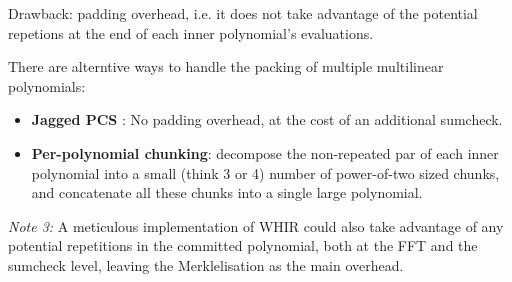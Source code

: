 \documentclass{article}
\theoremstyle{definition}
\begin{document}
Drawback: padding overhead, i.e. it does not take advantage of the potential repetions at the end of each inner polynomial's evaluations.

\vspace{5mm}

There are alterntive ways to handle the packing of multiple multilinear polynomials:

\begin{itemize}
    \item \textbf{Jagged PCS} \cite{jagged_pcs}: No padding overhead, at the cost of an additional sumcheck.
    \item  \textbf{Per-polynomial chunking}: decompose the non-repeated par of each inner polynomial into a small (think 3 or 4) number of power-of-two sized chunks, and concatenate all these chunks into a single large polynomial.
\end{itemize}

\textit{Note 3:} A meticulous implementation of WHIR could also take advantage of any potential repetitions in the committed polynomial, both at the FFT and the sumcheck level, leaving the Merklelisation as the main overhead.

\clearpage


\end{document}
